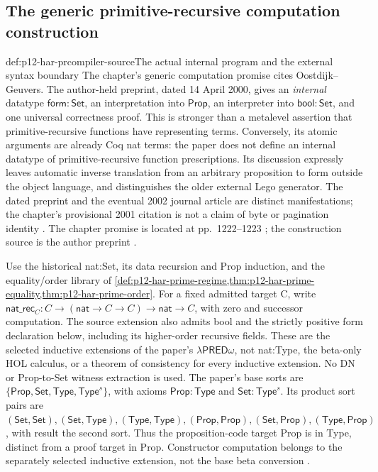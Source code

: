 \subsection{The generic primitive-recursive computation construction}

\begin{hbdefinition}{def:p12-har-prcompiler-source}{The actual internal program and the external syntax boundary}
The chapter's generic computation promise cites Oostdijk--Geuvers.
The author-held preprint, dated 14 April 2000, gives an \emph{internal}
datatype \(\mathsf{form}:\mathsf{Set}\), an interpretation into
\(\mathsf{Prop}\), an interpreter into \(\mathsf{bool}:\mathsf{Set}\),
and one universal correctness proof. This is stronger than a metalevel
assertion that primitive-recursive functions have representing terms.
Conversely, its atomic arguments are already Coq nat terms: the paper
does not define an internal datatype of primitive-recursive function
prescriptions. Its discussion expressly leaves automatic inverse
translation from an arbitrary proposition to form outside the object
language, and distinguishes the older external Lego generator.
The dated preprint and the eventual 2002 journal article are distinct
manifestations; the chapter's provisional 2001 citation is not a claim
of byte or pagination identity
\cite{OostdijkGeuvers2002ProofByComputation}.
The chapter promise is located at pp.~1222--1223
\cite{BarendregtGeuvers2001}; the construction source is the author preprint
\cite[\S\S4--5, pp.~17--25]{OostdijkGeuvers2000ProofByComputationPreprint}.

Use the historical nat:Set, its data recursion and Prop induction,
and the equality/order library of
\cref{def:p12-har-prime-regime,thm:p12-har-prime-equality,thm:p12-har-prime-order}.
For a fixed admitted target C, write
\(\mathsf{nat\_rec}_C:C\to(\mathsf{nat}\to C\to C)\to\mathsf{nat}\to C\),
with zero and successor computation. The source extension also admits
bool and the strictly positive form declaration below, including its
higher-order recursive fields. These are the selected inductive
extensions of the paper's \(\lambda\mathsf{PRED}\omega\), not
nat:Type, the beta-only HOL calculus, or a theorem of consistency for
every inductive extension. No DN or Prop-to-Set witness extraction is used.
The paper's base sorts are
\(\{\mathsf{Prop},\mathsf{Set},\mathsf{Type},\mathsf{Type}^{s}\}\),
with axioms \(\mathsf{Prop}:\mathsf{Type}\) and
\(\mathsf{Set}:\mathsf{Type}^{s}\). Its product sort pairs are
\((\mathsf{Set},\mathsf{Set}),(\mathsf{Set},\mathsf{Type}),
(\mathsf{Type},\mathsf{Type}),(\mathsf{Prop},\mathsf{Prop}),
(\mathsf{Set},\mathsf{Prop}),(\mathsf{Type},\mathsf{Prop})\),
with result the second sort. Thus the proposition-code target Prop
is in Type, distinct from a proof target in Prop. Constructor computation
belongs to the separately selected inductive extension, not the base
beta conversion \cite[Definition~1, p.~6; \S3]{OostdijkGeuvers2000ProofByComputationPreprint}.
\end{hbdefinition}

